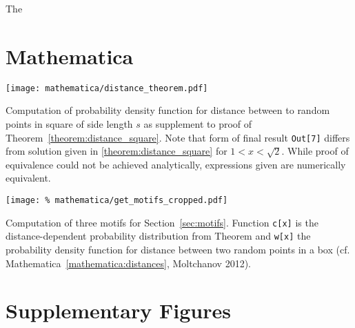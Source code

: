The


\section{Mathematica}

\vspace{-1cm}
\begin{mathematica}[H]
  \centering
  \captionsetup{format=plain, font=normal, skip=-3pt}
  \texttt{[image: mathematica/distance\_theorem.pdf]}
    \label{mathematica:distances}
  \caption{Computation of probability density function for distance
    between to random points in square of side length $s$ as
    supplement to proof of Theorem~\ref{theorem:distance_square}. Note
    that form of final result \texttt{Out[7]} differs from solution
    given in \ref{theorem:distance_square} for $1<x<\sqrt{2}$. While
    proof of equivalence could not be achieved analytically,
    expressions given are numerically equivalent.}
  
  \vspace{0.5cm}

  \texttt{[image: \%
    mathematica/get\_motifs\_cropped.pdf]}
    \captionsetup{format=plain, font=normal, skip=-3pt}
  \caption{Computation of three motifs for
    Section~\ref{sec:motifs}. Function \texttt{c[x]} is the
    distance-dependent probability distribution from Theorem and
    \texttt{w[x]} the probability density function for distance
    between two random points in a box
    (cf. Mathematica~\ref{mathematica:distances}, Moltchanov 2012).}
  \label{mathematica:motif}
\end{mathematica} 













\section{Supplementary Figures}\label{sec:supp_figures}

